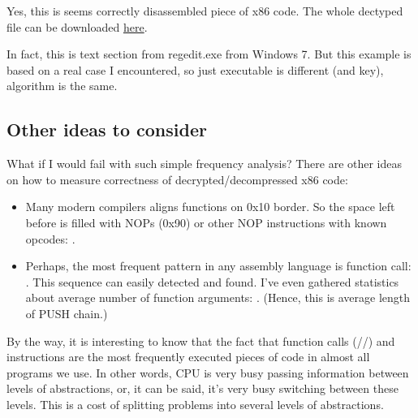 Yes, this is seems correctly disassembled piece of x86 code.
The whole dectyped file can be downloaded \href{https://github.com/dennis714/yurichev.com/blob/master/blog/breaking_simple_exec_crypto/files/decrypted.bin}{here}.

In fact, this is text section from regedit.exe from Windows 7.
But this example is based on a real case I encountered, so just executable is different (and key), algorithm is the same.

\subsection{Other ideas to consider}

What if I would fail with such simple frequency analysis?
There are other ideas on how to measure correctness of decrypted/decompressed x86 code:

\begin{itemize}

\item Many modern compilers aligns functions on 0x10 border.
So the space left before is filled with NOPs (0x90) or other NOP instructions with known opcodes: .

\item Perhaps, the most frequent pattern in any assembly language is function call:\\
.
This sequence can easily detected and found.
I've even gathered statistics about average number of function arguments: .
(Hence, this is average length of PUSH chain.)

\end{itemize}

By the way, 
it is interesting to know that the fact that function calls (\PUSH/\CALL/\ADD) and \MOV instructions are the most frequently executed pieces of code in almost all
programs we use.
In other words, CPU is very busy passing information between levels of abstractions, or, it can be said, it's very busy switching between these levels.
This is a cost of splitting problems into several levels of abstractions.

